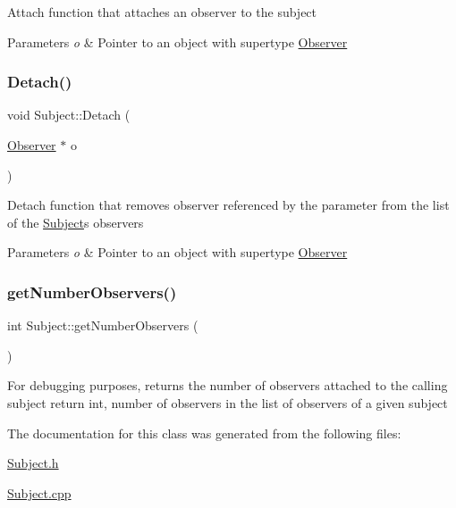 Attach function that attaches an observer to the subject 
\begin{DoxyParams}{Parameters}
{\em o} & Pointer to an object with supertype \hyperlink{class_observer}{Observer} \\
\hline
\end{DoxyParams}
\hypertarget{class_subject_ac839596fe840efb970e36a66554e3095}{}\label{class_subject_ac839596fe840efb970e36a66554e3095} 
\subsubsection{\texorpdfstring{Detach()}{Detach()}}
{\footnotesize\ttfamily void Subject\+::\+Detach (\begin{DoxyParamCaption}\item[{\hyperlink{class_observer}{Observer} $\ast$}]{o }\end{DoxyParamCaption})\hspace{0.3cm}{\ttfamily [virtual]}}

Detach function that removes observer referenced by the parameter from the list of the \hyperlink{class_subject}{Subject}\textquotesingle{}s observers 
\begin{DoxyParams}{Parameters}
{\em o} & Pointer to an object with supertype \hyperlink{class_observer}{Observer} \\
\hline
\end{DoxyParams}
\hypertarget{class_subject_a606f81da175e7ba807ed72482e4435bf}{}\label{class_subject_a606f81da175e7ba807ed72482e4435bf} 
\subsubsection{\texorpdfstring{get\+Number\+Observers()}{getNumberObservers()}}
{\footnotesize\ttfamily int Subject\+::get\+Number\+Observers (\begin{DoxyParamCaption}{ }\end{DoxyParamCaption})}

For debugging purposes, returns the number of observers attached to the calling subject return int, number of observers in the list of observers of a given subject 

The documentation for this class was generated from the following files\+:\begin{DoxyCompactItemize}
\item 
\hyperlink{_subject_8h}{Subject.\+h}\item 
\hyperlink{_subject_8cpp}{Subject.\+cpp}\end{DoxyCompactItemize}

